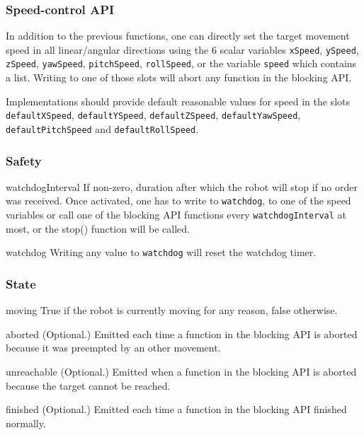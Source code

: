 \subsubsection{Speed-control API}

In addition to the previous functions, one can directly set the target
movement speed in all linear/angular directions using the 6 scalar variables
\lstinline{xSpeed}, \lstinline{ySpeed}, \lstinline{zSpeed},
\lstinline{yawSpeed}, \lstinline{pitchSpeed}, \lstinline{rollSpeed}, or the
variable \lstinline{speed} which contains a list.  Writing to one of those
slots will abort any function in the blocking API.

Implementations should provide default reasonable values for speed in the
slots \lstinline{defaultXSpeed}, \lstinline{defaultYSpeed},
\lstinline{defaultZSpeed}, \lstinline{defaultYawSpeed},
\lstinline{defaultPitchSpeed} and \lstinline{defaultRollSpeed}.

\subsubsection{Safety}

\begin{urbiscriptapi}

\item{watchdogInterval} If non-zero, duration after which the robot will
  stop if no order was received. Once activated, one has to write to
  \lstinline|watchdog|, to one of the speed variables or call one of the
  blocking API functions every \lstinline|watchdogInterval| at most, or the
  stop() function will be called.
\item{watchdog} Writing any value to \lstinline|watchdog| will reset the
  watchdog timer.

\end{urbiscriptapi}

\subsubsection{State}

\begin{urbiscriptapi}
\item[moving] True if the robot is currently moving for any reason, false
  otherwise.
\item[aborted] (Optional.) Emitted each time a function in the blocking API is aborted
  because it was preempted by an other movement.
\item[unreachable] (Optional.) Emitted when a function in the blocking API is aborted
  because the target cannot be reached.
\item[finished] (Optional.) Emitted each time a function in the blocking API finished
  normally.

\end{urbiscriptapi}

